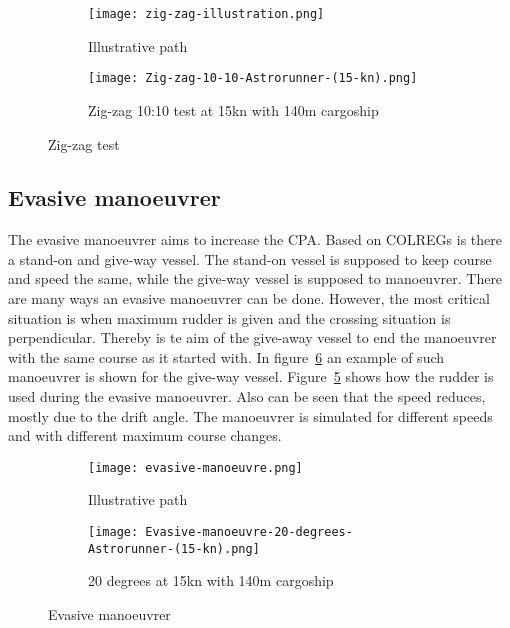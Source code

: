 \begin{figure}[p]
	\begin{subfigure}[b]{0.43\linewidth}
		\centering
		\texttt{[image: zig-zag-illustration.png]}
		\caption{Illustrative path}
		\label{fig:zig-zag-path}
	\end{subfigure} 
	\begin{subfigure}[b]{0.56\linewidth}
		\centering
		\texttt{[image: Zig-zag-10-10-Astrorunner-(15-kn).png]}
		\caption{Zig-zag 10:10 test at 15kn with 140m cargoship}
		\label{fig:zig-zag-astrorunner}
	\end{subfigure}
	\caption{Zig-zag test}
	\label{fig:zig-zag} 
\end{figure}

\subsection{Evasive manoeuvrer}
\label{sec:evasive-manoeuvrer}
The evasive manoeuvrer aims to increase the \acf{CPA}. Based on \ac{COLREGs} is there a stand-on and give-way vessel. The stand-on vessel is supposed to keep course and speed the same, while the give-way vessel is supposed to manoeuvrer. 
There are many ways an evasive manoeuvrer can be done. However, the most critical situation is when maximum rudder is given and the crossing situation is perpendicular. Thereby is te aim of the give-away vessel to end the manoeuvrer with the same course as it started with. In figure~\ref{fig:evasive-manoeuvrer} an example of such manoeuvrer is shown for the give-way vessel. Figure~\ref{fig:astrorunner-evasive-20} shows how the rudder is used during the evasive manoeuvrer. Also can be seen that the speed reduces, mostly due to the drift angle. The manoeuvrer is simulated for different speeds and with different maximum course changes. 

\begin{figure}[p]
	\begin{subfigure}[b]{0.43\linewidth}
		\centering
		\texttt{[image: evasive-manoeuvre.png]}
		\caption{Illustrative path}
		\label{fig:evasive-manoeuvrer-path}
	\end{subfigure} 
	\begin{subfigure}[b]{0.56\linewidth}
		\centering
		\texttt{[image: Evasive-manoeuvre-20-degrees-Astrorunner-(15-kn).png]}
		\caption{20 degrees at 15kn with 140m cargoship}
		\label{fig:astrorunner-evasive-20}
	\end{subfigure}
	\caption{Evasive manoeuvrer}
	\label{fig:evasive-manoeuvrer} 
\end{figure}
\clearpage

